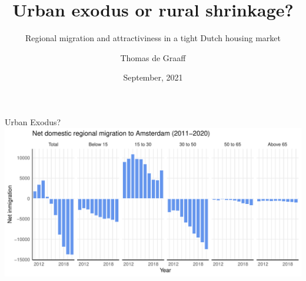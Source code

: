 \documentclass{beamer}
\title{Urban exodus or rural shrinkage?}
\subtitle{Regional migration and attractiviness in a tight Dutch housing market}
\date{September, 2021}
\author{Thomas de Graaff}
\institute{Vrije Universiteit Amsterdam\\Tinbergen Institute Amsterdam}
\begin{document}
\maketitle

\begin{frame}{Urban Exodus?}
	\includegraphics[width=1.0\textwidth]{../../fig/outmig_amsterdam.pdf}
\end{frame}
\end{document}
